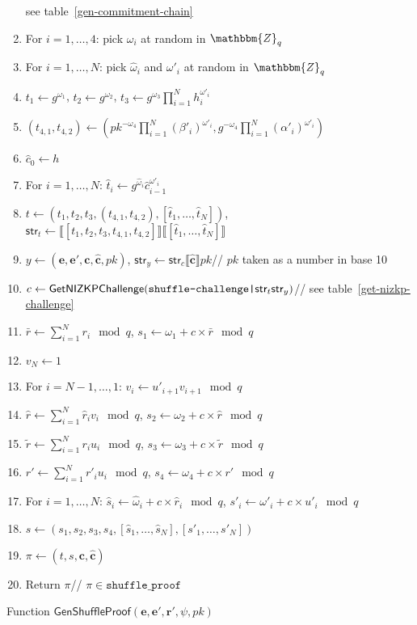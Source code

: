\documentclass[a4paper]{article}
\newcommand{\Z}{\mathbbm{Z}}
\begin{document}
\begin{table}
\begin{framed}
\begin{enumerate}
      see table~\ref{gen-commitment-chain}
    \item For $i=1,\dots,4$: pick $\omega_i$ at random in $\Z_q$
    \item For $i=1,\dots,N$: pick $\hat{\omega}_i$ and $\omega'_i$ at random in $\Z_q$
    \item $t_1\leftarrow g^{\omega_1}$, $t_2\leftarrow g^{\omega_2}$,
      $t_3\leftarrow g^{\omega_3}\prod_{i=1}^N h_i^{\omega'_i}$
    \item
      $(t_{4,1},t_{4,2})\leftarrow(pk^{-\omega_4}\prod_{i=1}^N(\beta'_i)^{\omega'_i},g^{-\omega_4}\prod_{i=1}^N(\alpha'_i)^{\omega'_i})$
    \item $\hat{c}_0\leftarrow h$
    \item For $i=1,\dots,N$:
      $\hat{t}_i\leftarrow
      g^{\hat{\omega}_i}\hat{c}_{i-1}^{\omega'_i}$
    \item
      $t\leftarrow(t_1,t_2,t_3,(t_{4,1},t_{4,2}),[\hat{t}_1,\dots,\hat{t}_N])$,
      $\textsf{str}_t\leftarrow\llbracket[t_1,t_2,t_3,t_{4,1},t_{4,2}]\rrbracket\llbracket[\hat{t}_1,\dots,\hat{t}_N]\rrbracket$
    \item
      $y\leftarrow(\textbf{e},\textbf{e}',\textbf{c},\hat{\textbf{c}},pk)$,
      $\textsf{str}_y\leftarrow\textsf{str}_c\llbracket\hat{\textbf{c}}\rrbracket
      pk$\hfill// $pk$ taken as a number in base 10
    \item
      $c\leftarrow\textsf{GetNIZKPChallenge}(\verb=shuffle-challenge|=\textsf{str}_t\textsf{str}_y)$\hfill//
      see table~\ref{get-nizkp-challenge}
    \item $\bar{r}\leftarrow\sum_{i=1}^N r_i\mod q$,
      $s_1\leftarrow\omega_1+c\times\bar{r}\mod q$
    \item $v_N\leftarrow 1$
    \item For $i=N-1,\dots,1$: $v_i\leftarrow u'_{i+1}v_{i+1}\mod q$
    \item $\hat{r}\leftarrow\sum_{i=1}^N \hat{r}_iv_i\mod q$, $s_2\leftarrow\omega_2+c\times\hat{r}\mod q$
    \item $\tilde{r}\leftarrow\sum_{i=1}^N r_iu_i\mod q$, $s_3\leftarrow\omega_3+c\times\tilde{r}\mod q$
    \item $r'\leftarrow\sum_{i=1}^N r'_iu_i\mod q$, $s_4\leftarrow\omega_4+c\times r'\mod q$
    \item For $i=1,\dots,N$:
      $\hat{s}_i\leftarrow\hat{\omega}_i+c\times\hat{r}_i\mod q$,
      $s'_i\leftarrow\omega'_i+c\times u'_i\mod q$
    \item
      $s\leftarrow(s_1,s_2,s_3,s_4,[\hat{s}_1,\dots,\hat{s}_N],[s'_1,\dots,s'_N])$
    \item $\pi\leftarrow(t,s,\textbf{c},\hat{\textbf{c}})$
    \item Return $\pi$\hfill// $\pi\in\texttt{shuffle\_proof}$
    \end{enumerate}
  \end{framed}
  \caption{Function $\mathsf{GenShuffleProof}(\textbf{e},\textbf{e}',\textbf{r}',\psi,pk)$}
  \label{gen-shuffle-proof}
\end{table}
\end{document}
